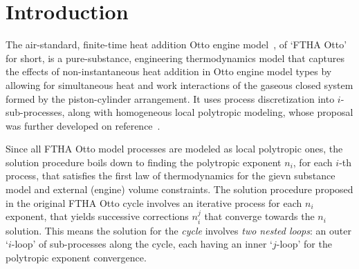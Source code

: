 \section{Introduction}

    The air-standard, finite-time heat addition Otto engine model~\cite{2017-NaaktgeborenC-IntJMechEngEduc}, of `FTHA Otto'  for
    short, is a pure-substance, engineering thermodynamics model that captures the effects of non-instantaneous heat addition in
    Otto engine model types by allowing for simultaneous heat and work interactions of the gaseous closed system formed  by  the
    piston-cylinder arrangement. It uses process discretization into $i$-sub-processes, along with homogeneous local  polytropic
    modeling, whose proposal was further developed on reference~\cite{2020-NaaktgeborenC-Polytropic-engrXiv-rev02}.

    Since all FTHA Otto model processes are modeled as local polytropic ones, the solution procedure boils down to  finding  the
    polytropic exponent $n_i$, for each $i$-th process, that satisfies the first law of thermodynamics for the  gievn  substance
    model and external (engine) volume constraints. The solution procedure proposed in the original FTHA Otto cycle involves  an
    iterative process for each $n_i$ exponent, that yields successive  corrections  $n_i^j$  that  converge  towards  the  $n_i$
    solution. This means  the  solution  for  the  \emph{cycle}  involves  \emph{two  nested  loops}:  an  outer  `$i$-loop'  of
    sub-processes along the cycle, each having an inner `$j$-loop' for the polytropic exponent convergence.

    


